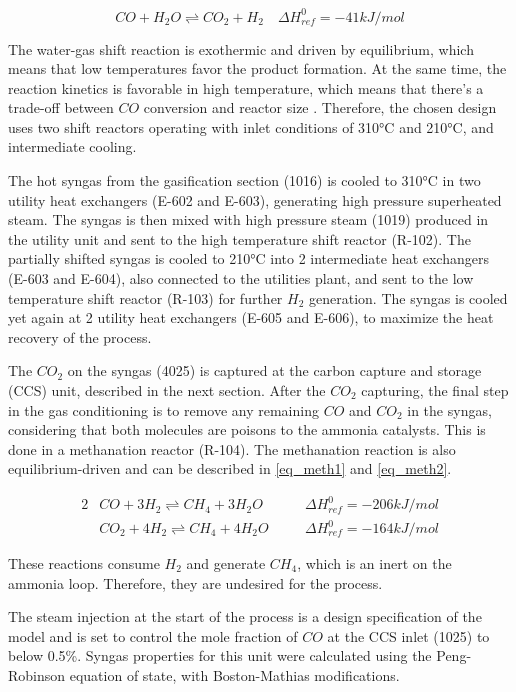 \documentclass[a4paper, titlepage]{article}
\begin{document}
\begin{equation}
    CO + H_2O \rightleftharpoons CO_2 + H_2 \quad \Delta H_{ref}^0 = -41 kJ/mol
    \label{eq_shift}
\end{equation}

The water-gas shift reaction is exothermic and driven by equilibrium, which means that low temperatures favor the
product formation. At the same time, the reaction kinetics is favorable in high temperature, which means that there's
a trade-off between $CO$ conversion and reactor size \cite{florez-orregoProcessSynthesisOptimization2018}. Therefore,
the chosen design uses two shift reactors operating with inlet conditions of 310°C and 210°C, and intermediate cooling.

The hot syngas from the gasification section (1016) is cooled to 310°C in two utility heat exchangers (E-602 and E-603),
generating high pressure superheated steam. The syngas is then mixed with high pressure steam (1019) produced in the
utility unit and sent to the high temperature shift reactor (R-102). The partially shifted syngas is cooled to 210°C
into 2 intermediate heat exchangers (E-603 and E-604), also connected to the utilities plant, and sent to the low
temperature shift reactor (R-103) for further $H_2$ generation. The syngas is cooled yet again at 2 utility heat
exchangers (E-605 and E-606), to maximize the heat recovery of the process.

The $CO_2$ on the syngas (4025) is captured at the carbon capture and storage (CCS) unit, described in the next section.
After the $CO_2$ capturing, the final step in the gas conditioning is to remove any remaining $CO$ and $CO_2$ in the
syngas, considering that both molecules are poisons to the ammonia catalysts. This is done in a methanation reactor
(R-104). The methanation reaction is also equilibrium-driven and can be described in \autoref{eq_meth1} and
\autoref{eq_meth2}.

\begin{alignat}{2}
     & CO + 3H_2 \rightleftharpoons CH_4 + 3H_2O \quad   &  & \Delta H_{ref}^0 = -206 kJ/mol \label{eq_meth1} \\
     & CO_2 + 4H_2 \rightleftharpoons CH_4 + 4H_2O \quad &  & \Delta H_{ref}^0 = -164 kJ/mol \label{eq_meth2}
\end{alignat}

These reactions consume $H_2$ and generate $CH_4$, which is an inert on the ammonia loop. Therefore, they are undesired
for the process.

The steam injection at the start of the process is a design specification of the model and is set to control the mole
fraction of $CO$ at the CCS inlet (1025) to below 0.5\%. Syngas properties for this unit were calculated using
the Peng-Robinson equation of state, with Boston-Mathias modifications.
\end{document}
